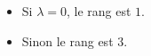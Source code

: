 \begin{itemize}
 \item Si $\lambda=0$, le rang est $1$.
 \item Sinon le rang est $3$.
\end{itemize}
